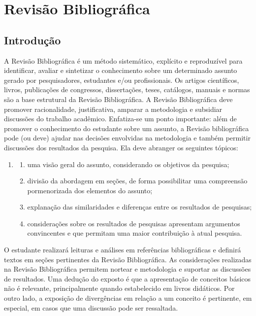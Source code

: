 \chapter{Revisão Bibliográfica}

\section{Introdução}

A Revisão Bibliográfica é um método sistemático, explícito e reproduzível para identificar, avaliar e sintetizar o conhecimento sobre um determinado assunto gerado por pesquisadores, estudantes e/ou profissionais. Os artigos científicos, livros, publicações de congressos, dissertações, teses, catálogos, manuais e normas são a base estrutural da Revisão Bibliográfica. A Revisão Bibliográfica deve promover racionalidade, justificativa, amparar a metodologia e subsidiar discussões do trabalho acadêmico. Enfatiza-se um ponto importante: além de promover o conhecimento do estudante sobre um assunto, a Revisão bibliográfica pode (ou deve) ajudar nas decisões envolvidas na metodologia e também permitir discussões dos resultados da pesquisa. Ela deve abranger os seguintes tópicos:

\begin{enumerate}
	\item[]	
	\begin{enumerate}
		\item uma visão geral do assunto, considerando os objetivos da pesquisa;
		\item divisão da abordagem em seções, de forma possibilitar uma compreensão pormenorizada dos elementos do assunto;
		\item explanação das similaridades e diferenças entre os resultados de pesquisas;
		\item considerações sobre os resultados de pesquisas apresentam argumentos convincentes e que permitam uma maior contribuição à atual pesquisa.
	\end{enumerate}
\end{enumerate}

O estudante realizará leituras e análises em referências bibliográficas e definirá textos em seções pertinentes da Revisão Bibliográfica. As considerações realizadas na Revisão Bibliográfica permitem nortear e metodologia e suportar as discussões de resultados. Uma dedução do exposto é que a apresentação de conceitos básicos não é relevante, principalmente quando estabelecido em livros didáticos. Por outro lado, a exposição de divergências em relação a um conceito é pertinente, em especial, em casos que uma discussão pode ser ressaltada.


